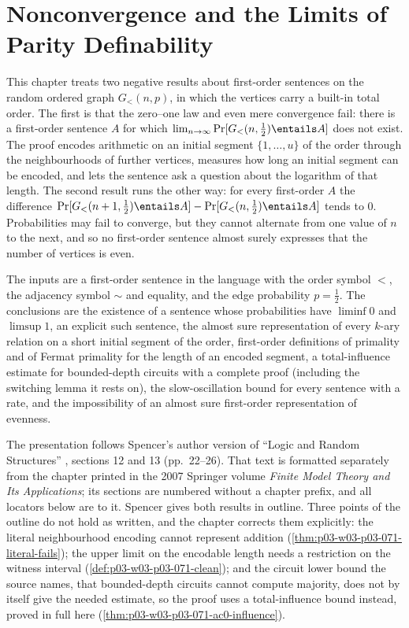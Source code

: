 \chapter{Nonconvergence and the Limits of Parity Definability}
\label{sec:p03-w03-p03-071-nonconvergence}

This chapter treats two negative results about first-order sentences on the
random ordered graph \(G_<(n,p)\), in which the vertices carry a built-in
total order.  The first is that the zero--one law and even mere convergence
fail: there is a first-order sentence \(A\) for which
\(\lim_{n\to\infty}\Pr[G_<(n,\frac12)\entails A]\) does not exist.  The proof
encodes arithmetic on an initial segment \(\{1,\ldots,u\}\) of the order
through the neighbourhoods of further vertices, measures how long an initial
segment can be encoded, and lets the sentence ask a question about the
logarithm of that length.  The second result runs the other way: for every
first-order \(A\) the difference
\(\Pr[G_<(n+1,\frac12)\entails A]-\Pr[G_<(n,\frac12)\entails A]\) tends to
\(0\).  Probabilities may fail to converge, but they cannot alternate from
one value of \(n\) to the next, and so no first-order sentence almost surely
expresses that the number of vertices is even.

The inputs are a first-order sentence in the language with the order symbol
\(<\), the adjacency symbol \(\sim\) and equality, and the edge probability
\(p=\frac12\).  The conclusions are the existence of a sentence whose
probabilities have \(\liminf 0\) and \(\limsup 1\), an explicit such
sentence, the almost sure representation of every \(k\)-ary relation on a
short initial segment of the order, first-order definitions of primality
and of Fermat primality for the length of an encoded segment, a
total-influence estimate for bounded-depth circuits with a complete proof
(including the switching lemma it rests on), the slow-oscillation bound for
every sentence with a rate, and the impossibility of an almost sure
first-order representation of evenness.

The presentation follows Spencer's author version of ``Logic and Random
Structures'' \cite{Spencer2007LogicRandomStructuresAuthor}, sections 12 and
13 (pp.~22--26).  That text is formatted separately from the chapter printed
in the 2007 Springer volume \emph{Finite Model Theory and Its Applications};
its sections are numbered without a chapter prefix, and all locators below
are to it.  Spencer gives both results in outline.  Three points of the
outline do not hold as written, and the chapter corrects them explicitly:
the literal neighbourhood encoding cannot represent addition
(\cref{thm:p03-w03-p03-071-literal-fails}); the upper limit on the encodable
length needs a restriction on the witness interval
(\cref{def:p03-w03-p03-071-clean}); and the circuit lower bound the source
names, that bounded-depth circuits cannot compute majority, does not by
itself give the needed estimate, so the proof uses a total-influence bound
instead, proved in full here (\cref{thm:p03-w03-p03-071-ac0-influence}).

